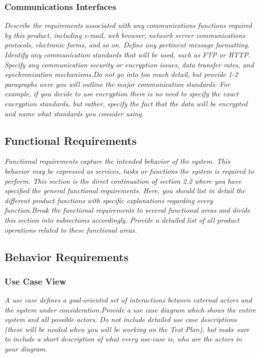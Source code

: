         \subsubsection{Communications Interfaces}\label{sec:communications-interfaces}
            \emph{Describe the requirements associated with any communications functions required by this product, including e-mail, web browser, network server communications protocols, electronic forms, and so on. Define any pertinent message formatting. Identify any communication standards that will be used, such as FTP or HTTP. Specify any communication security or encryption issues, data transfer rates, and synchronization mechanisms.\gnl Do not go into too much detail, but provide 1-2 paragraphs were you will outline the major communication standards. For example, if you decide to use encryption there is no need to specify the exact encryption standards, but rather, specify the fact that the data will be encrypted and name what standards you consider using.}
    \subsection{Functional Requirements}\label{sec:functional-requirements}
        \emph{Functional requirements capture the intended behavior of the system. This behavior may be expressed as services, tasks or functions the system is required to perform. This section is the direct continuation of section 2.2 where you have specified the general functional requirements. Here, you should list in detail the different product functions with specific explanations regarding every function.\gnl Break the functional requirements to several functional areas and divide this section into subsections accordingly. Provide a detailed list of all product operations related to these functional areas.}
    \subsection{Behavior Requirements}\label{sec:behavior-requirements}
        \subsubsection{Use Case View}\label{sec:use-case-view}
            \emph{A use case defines a goal-oriented set of interactions between external actors and the system under consideration.\gnl Provide a use case diagram which shows the entire system and all possible actors. Do not include detailed use case descriptions (these will be needed when you will be working on the Test Plan), but make sure to include a short description of what every use-case is, who are the actors in your diagram.}
